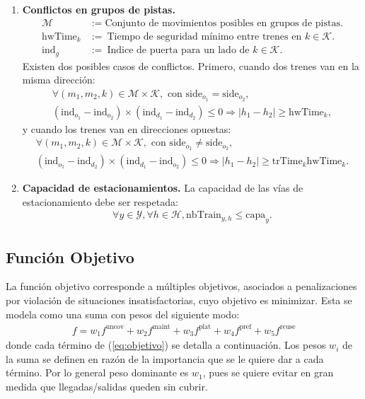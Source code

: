 \documentclass[letter, 10pt]{article}
\begin{document}
\begin{description}
\begin{enumerate}
        \item \textbf{Conflictos en grupos de pistas.}
        \begin{align*}
            \mathcal{M} &:= \text{Conjunto de movimientos posibles en grupos de pistas}.\\
            \text{hwTime}_k &:= \ \text{Tiempo de seguridad mínimo entre trenes en } k \in \mathcal{K}. \\
            \text{ind}_g &:= \ \text{Indice de puerta para un lado de } k \in \mathcal{K}.
        \end{align*}
        Existen dos posibles casos de conflictos. Primero, cuando dos trenes van en la misma dirección:
        \begin{align*}
            \forall (m_1,m_2,k) \in \mathcal{M}\times \mathcal{K}, \text{ con } \text{side}_{o_1} = \text{side}_{o_2}, \\
            (\text{ind}_{o_1}-\text{ind}_{o_2})\times (\text{ind}_{d_1}-\text{ind}_{d_2}) \leq 0 \Rightarrow |h_1-h_2| \geq \text{hwTime}_k,
        \end{align*}
        y cuando los trenes van en direcciones opuestas:
        \begin{align*}
            \forall (m_1,m_2,k) \in \mathcal{M}\times \mathcal{K}, \text{ con } \text{side}_{o_1} \neq \text{side}_{o_2}, \\
            (\text{ind}_{o_1}-\text{ind}_{d_2})\times (\text{ind}_{d_1}-\text{ind}_{o_2}) \leq 0 \Rightarrow |h_1-h_2| \geq \text{trTime}_k \text{hwTime}_k.
        \end{align*}



        \item \textbf{Capacidad de estacionamientos.} La capacidad de las vías de estacionamiento debe ser respetada:
        \begin{align*}
            \forall y \in \mathcal{Y}, \forall h \in \mathcal{H}, \text{nbTrain}_{y,h} \leq \text{capa}_y.
        \end{align*}
    \end{enumerate}

\end{description}

\subsection{Función Objetivo}
    La función objetivo corresponde a múltiples objetivos, asociados a penalizaciones por violación de situaciones insatisfactorias, cuyo objetivo es minimizar. Esta se modela como una suma con pesos del siguiente modo:
    \begin{align}
     f = w_1 f^{\text{uncov}} + w_2 f^{\text{maint}} + w_3 f^{\text{plat}} + w_4 f^{\text{pref}} + w_5 f^{\text{reuse}}
     \label{eq:objetivo}    
    \end{align}
    donde cada término de (\ref{eq:objetivo}) se detalla a continuación. Los pesos $w_i$ de la suma se definen en razón de la importancia que se le quiere dar a cada término. Por lo general peso dominante es $w_1$, pues se quiere evitar en gran medida que llegadas/salidas queden sin cubrir.
\end{document}
